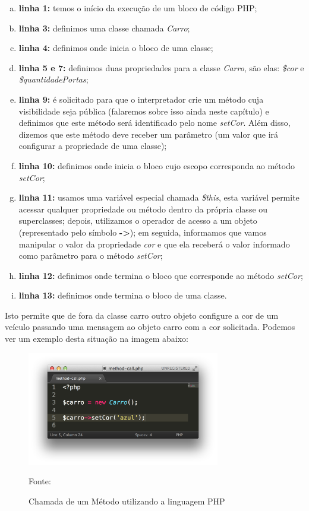 \begin{enumerate}[a)]
    \item \textbf{linha 1:} temos o início da execução de um bloco de código PHP;
    \item \textbf{linha 3:} definimos uma classe chamada \textit{Carro};
    \item \textbf{linha 4:} definimos onde inicia o bloco de uma classe;
    \item \textbf{linha 5 e 7:} definimos duas propriedades para a classe
    \textit{Carro}, são elas: \textit{\$cor} e \textit{\$quantidadePortas};
    \item \textbf{linha 9:} é solicitado para que o interpretador crie um método
    cuja visibilidade seja pública (falaremos sobre isso ainda neste capítulo) 
    e definimos que este método será identificado pelo nome \textit{setCor}.
    Além disso, dizemos que este método deve receber um parâmetro (um valor 
    que  irá configurar a propriedade de uma classe);
    \item \textbf{linha 10:} definimos onde inicia o bloco cujo escopo
    corresponda ao método \textit{setCor};
    \item \textbf{linha 11:} usamos uma variável especial chamada
    \textit{\$this}, esta variável permite acessar qualquer propriedade ou
    método dentro da própria classe ou superclasses; depois, utilizamos o 
    operador de acesso a um objeto (representado pelo símbolo \textbf{->}); em
    seguida, informamos que vamos manipular o valor da propriedade \textit{cor}
    e que ela receberá o valor informado como parâmetro para o método \textit{setCor};
    \item \textbf{linha 12:} definimos onde termina o bloco que corresponde ao
    método \textit{setCor};
    \item \textbf{linha 13:} definimos onde termina o bloco de uma classe.
\end{enumerate}
				
Isto permite que de fora da classe carro outro objeto configure a cor de um
veículo passando uma mensagem ao objeto carro com a cor solicitada. Podemos ver 
um exemplo desta situação na imagem abaixo:


\begin{figure}[h!tb]
	\caption{Chamada de um Método utilizando a linguagem PHP}
	\label{fig:chamadaMetodo}
	
	\centering
	\includegraphics[width=0.75\textwidth]{images/method-call.png}
	
	\centering
	\footnotesize Fonte: \fonteOAutor
\end{figure}

